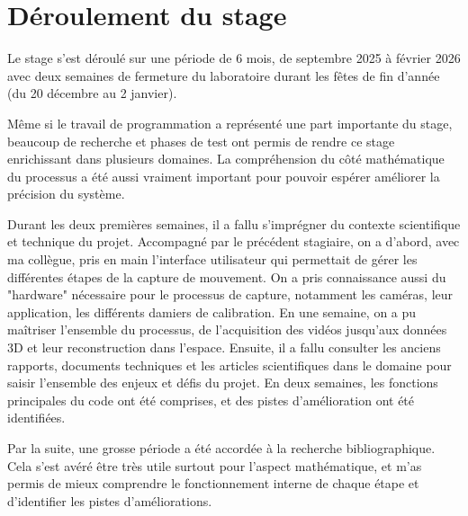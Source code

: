 \section{Déroulement du stage}
    Le stage s'est déroulé sur une période de 6 mois, de septembre 2025 à février 2026 avec deux semaines de fermeture du laboratoire durant les fêtes de fin d'année (du 20 décembre au 2 janvier).

    Même si le travail de programmation a représenté une part importante du stage, beaucoup de recherche et phases de test ont permis de rendre ce stage enrichissant dans plusieurs domaines. La compréhension du côté mathématique du processus a été aussi vraiment important pour pouvoir espérer améliorer la précision du système.

    Durant les deux premières semaines, il a fallu s'imprégner du contexte scientifique et technique du projet. Accompagné par le précédent stagiaire, on a d'abord, avec ma collègue, pris en main l'interface utilisateur qui permettait de gérer les différentes étapes de la capture de mouvement. On a pris connaissance aussi du "hardware" nécessaire pour le processus de capture, notamment les caméras, leur application, les différents damiers de calibration. En une semaine, on a pu maîtriser l'ensemble du processus, de l'acquisition des vidéos jusqu'aux données 3D et leur reconstruction dans l'espace. Ensuite, il a fallu consulter les anciens rapports, documents techniques et les articles scientifiques dans le domaine pour saisir l'ensemble des enjeux et défis du projet. En deux semaines, les fonctions principales du code ont été comprises, et des pistes d'amélioration ont été identifiées.

    Par la suite, une grosse période a été accordée à la recherche bibliographique. Cela s'est avéré être très utile surtout pour l'aspect mathématique, et m'as permis de mieux comprendre le fonctionnement interne de chaque étape et d'identifier les pistes d'améliorations.